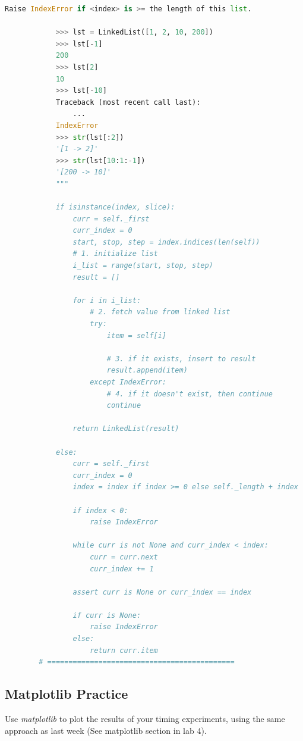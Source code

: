 \documentclass[12pt]{article}
\begin{document}
\begin{mdframed}
\begin{lstlisting}[language=python,caption={task\_4\_part\_1\_solution.py}]
            Raise IndexError if <index> is >= the length of this list.

            >>> lst = LinkedList([1, 2, 10, 200])
            >>> lst[-1]
            200
            >>> lst[2]
            10
            >>> lst[-10]
            Traceback (most recent call last):
                ...
            IndexError
            >>> str(lst[:2])
            '[1 -> 2]'
            >>> str(lst[10:1:-1])
            '[200 -> 10]'
            """

            if isinstance(index, slice):
                curr = self._first
                curr_index = 0
                start, stop, step = index.indices(len(self))
                # 1. initialize list
                i_list = range(start, stop, step)
                result = []

                for i in i_list:
                    # 2. fetch value from linked list
                    try:
                        item = self[i]

                        # 3. if it exists, insert to result
                        result.append(item)
                    except IndexError:
                        # 4. if it doesn't exist, then continue
                        continue

                return LinkedList(result)

            else:
                curr = self._first
                curr_index = 0
                index = index if index >= 0 else self._length + index

                if index < 0:
                    raise IndexError

                while curr is not None and curr_index < index:
                    curr = curr.next
                    curr_index += 1

                assert curr is None or curr_index == index

                if curr is None:
                    raise IndexError
                else:
                    return curr.item
        # ============================================
\end{lstlisting}
\end{mdframed}


\subsection*{Matplotlib Practice}
Use \textit{matplotlib} to plot the results of your timing experiments, using the same
approach as last week (See matplotlib section in lab 4).
\end{document}
